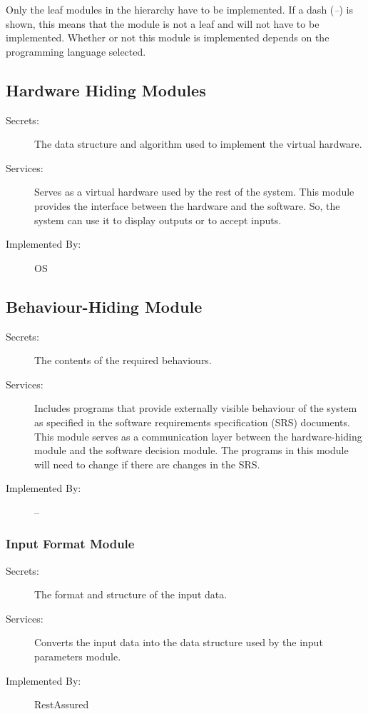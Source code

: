 \documentclass[12pt, titlepage]{article}
\begin{document}
Only the leaf modules in the
hierarchy have to be implemented. If a dash (\emph{--}) is shown, this means
that the module is not a leaf and will not have to be implemented. Whether or
not this module is implemented depends on the programming language
selected.


\subsection{Hardware Hiding Modules }
\begin{description}
\item[Secrets:]The data structure and algorithm used to implement the virtual
  hardware.
\item[Services:]Serves as a virtual hardware used by the rest of the
  system. This module provides the interface between the hardware and the
  software. So, the system can use it to display outputs or to accept inputs.
\item[Implemented By:] OS
\end{description}


\subsection{Behaviour-Hiding Module}
\begin{description}
\item[Secrets:]The contents of the required behaviours.
\item[Services:]Includes programs that provide externally visible behaviour of
  the system as specified in the software requirements specification (SRS)
  documents. This module serves as a communication layer between the
  hardware-hiding module and the software decision module. The programs in this
  module will need to change if there are changes in the SRS.
\item[Implemented By:] --
\end{description}


\subsubsection{Input Format Module}
\begin{description}
\item[Secrets:]The format and structure of the input data.
\item[Services:]Converts the input data into the data structure used by the
  input parameters module.
\item[Implemented By:] RestAssured
\end{description}
\end{document}
